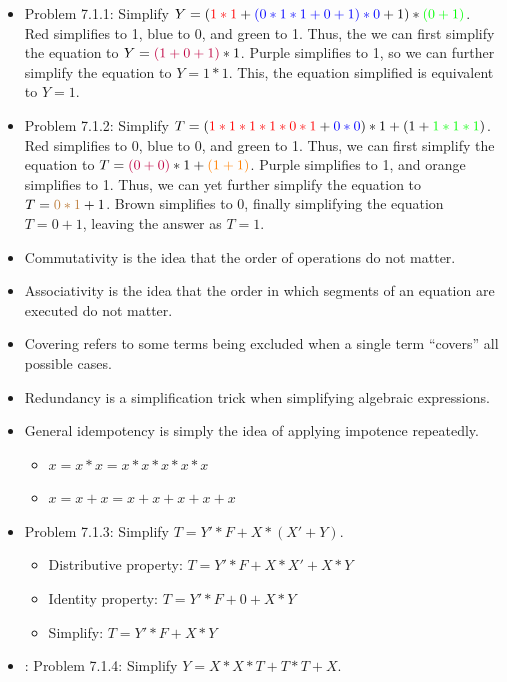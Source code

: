 \documentclass[10pt,a4paper]{article}
\newcommand{\answer}[1]{\boxed{\text{Answer: #1}}}
\begin{document}
\begin{itemize}
\item Problem 7.1.1: Simplify $Y=(\textcolor{red}{1*1}+\textcolor{blue}{(0*1*1+0+1)*0}+1)*\textcolor{green}{(0+1)}$.\\
Red simplifies to 1, blue to 0, and green to 1. Thus, the we can first simplify the equation to $Y=\textcolor{purple}{(1+0+1)}*1$. Purple simplifies to 1, so we can further simplify the equation to $Y=1*1$. This, the equation simplified is equivalent to $Y=1$.\\
\answer{$Y=1$}
\item Problem 7.1.2: Simplify $T=(\textcolor{red}{1*1*1*1*0*1}+\textcolor{blue}{0*0})*1+(1+\textcolor{green}{1*1*1})$.\\
Red simplifies to 0, blue to 0, and green to 1. Thus, we can first simplify the equation to $T=\textcolor{purple}{(0+0)}*1+\textcolor{orange}{(1+1)}$. Purple simplifies to 1, and orange simplifies to 1. Thus, we can yet further simplify the equation to $T=\textcolor{brown}{0*1}+1$. Brown simplifies to 0, finally simplifying the equation $T=0+1$, leaving the answer as $T=1$.\\
\answer{$T=1$}
\item Commutativity is the idea that the order of operations do not matter.
\item Associativity is the idea that the order in which segments of an equation are executed do not matter.
\item Covering refers to some terms being excluded when a single term ``covers'' all possible cases.  
\item Redundancy is a simplification trick when simplifying algebraic expressions. 
\item General idempotency is simply the idea of applying impotence repeatedly.
\begin{itemize}
\item $x=x*x=x*x*x*x*x$
\item $x=x+x=x+x+x+x+x$
\end{itemize}
\item Problem 7.1.3: Simplify $T=Y'*F+X*(X'+Y)$.
\begin{itemize}
\item Distributive property: $T=Y'*F+X*X'+X*Y$
\item Identity property: $T=Y'*F+0+X*Y$
\item Simplify: $T=Y'*F+X*Y$
\end{itemize}
\answer{$T=Y'*F+X*Y$}
\item: Problem 7.1.4: Simplify $Y=X*X*T+T*T+X$.
\begin{itemize}

\end{itemize}
\end{itemize}
\end{document}

